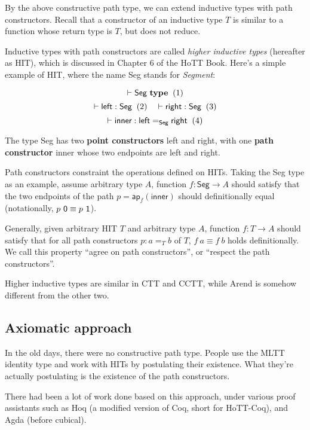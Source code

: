 By the above constructive path type,
we can extend inductive types with path constructors.
Recall that a constructor of an inductive type $T$ is
similar to a function whose return type is $T$,
but does not reduce.

Inductive types with path constructors are called
\textit{higher inductive types} (hereafter as HIT),
which is discussed in Chapter 6 of the HoTT Book.
Here's a simple example of HIT,
where the name \textsf{Seg} stands for \textit{Segment}:

\[
  \vdash \textsf{Seg} \ \textbf{type}
  \xtag
\]
\[
  \vdash \textsf{left} : \textsf{Seg}
  \xtag
  \quad
  \vdash \textsf{right} : \textsf{Seg}
  \xtag
\]
\[
  \vdash \textsf{inner} :
  \textsf{left} =_{\textsf{Seg}} \textsf{right}
  \xtag
\]

The type \textsf{Seg} has two \textbf{point constructors}
\textsf{left} and \textsf{right}, with one \textbf{path constructor}
\textsf{inner} whose two endpoints are \textsf{left} and \textsf{right}.

Path constructors constraint the operations defined on HITs.
Taking the \textsf{Seg} type as an example,
assume arbitrary type $A$, function $f : \textsf{Seg} \rightarrow A$
should satisfy that the two endpoints of the path $p = \textsf{ap}_f(\textsf{inner})$
should definitionally equal (notationally, $p\ \textsf 0 \equiv p\ \textsf 1$).

Generally, given arbitrary HIT $T$ and arbitrary type $A$,
function $f : T \rightarrow A$ should satisfy that for all path constructors
$p : a =_T b$ of $T$, $f\ a \equiv f\ b$ holds definitionally.
We call this property ``agree on path constructors'',
or ``respect the path constructors''.

Higher inductive types are similar in CTT and CCTT,
while Arend is somehow different from the other two.

\subsection{Axiomatic approach}

In the old days, there were no constructive path type.
People use the MLTT identity type and
work with HITs by postulating their existence.
What they're actually postulating is the existence of the path constructors.

There had been a lot of work done based on this approach,
under various proof assistants such as Hoq
(a modified version of Coq, short for HoTT-Coq),
and Agda (before cubical).

